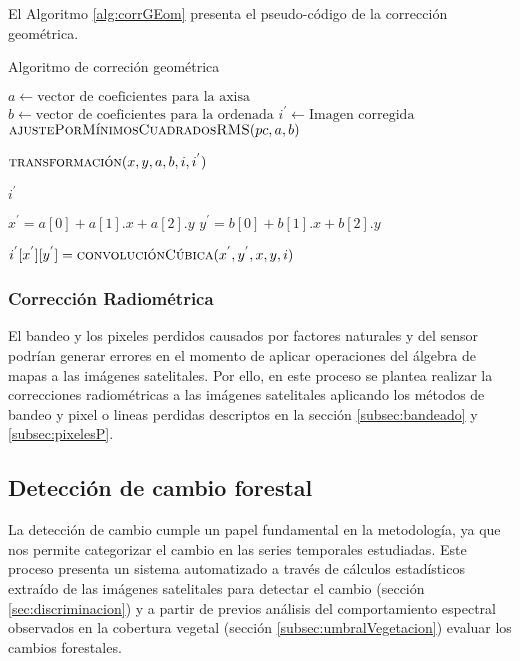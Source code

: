 El Algoritmo \ref{alg:corrGEom} presenta el pseudo-código de la correcci\'on geom\'etrica.

\begin{algorithm}
	\caption{Algoritmo de correci\'on geom\'etrica}
	\label{alg:corrGEom}
	\begin{algorithmic}[1]
		\Statex
		
		\State $a \gets \text{vector de coeficientes para la axisa}$
		\State $b \gets \text{vector de coeficientes para la ordenada}$
		\State $i^{'} \gets \text{Imagen corregida}$
		\State
		\State $\textsc{ajustePorM\'inimosCuadradosRMS}(pc,a,b)$ 
		\State


		
					\State $\textsc{transformaci\'on}(x,y,a,b,i,i^{'})$
				\EndFor
			\EndFor
			
			\Return $ i^{'} $
		
		\EndFunction
		
		\State
		\State
			\State $x^{'} = a[0]+a[1].x+a[2].y$
			\State $y^{'} = b[0]+b[1].x+b[2].y$
			
			\State $i^{'}[x^{'}][y^{'}]=\textsc{convoluci\'onC\'ubica}(x^{'},y^{'},x,y,i)$
			
		\EndProcedure
	\end{algorithmic}
\end{algorithm}


\subsubsection{Correcci\'on Radiom\'etrica}
El bandeo y los pixeles perdidos causados por factores naturales y del sensor podr\'ian generar errores en el momento de aplicar operaciones del \'algebra de mapas a las im\'agenes satelitales. Por ello, en este proceso se plantea realizar la correcciones radiom\'etricas a las im\'agenes satelitales aplicando los m\'etodos de bandeo y pixel o lineas perdidas descriptos en la secci\'on \ref{subsec:bandeado} y \ref{subsec:pixelesP}.

\subsection{Detecci\'on de cambio forestal}
La detecci\'on de cambio cumple un papel fundamental en la metodolog\'ia, ya que nos permite categorizar el cambio en las series temporales estudiadas. Este proceso presenta un sistema automatizado a trav\'es de c\'alculos estad\'isticos extra\'ido de las im\'agenes satelitales para detectar el cambio (secci\'on \ref{sec:discriminacion}) y a partir de previos an\'alisis del comportamiento espectral observados en la cobertura vegetal (secci\'on \ref{subsec:umbralVegetacion}) evaluar los cambios forestales.

